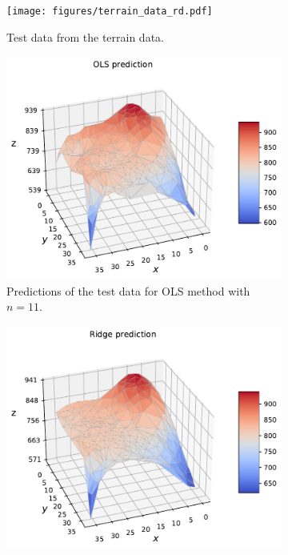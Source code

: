 \documentclass[norsk,a4paper,12pt]{scrartcl}
\begin{document}
\begin{figure}[H]
     \centering
     \begin{subfigure}[b]{0.49\textwidth}
         \centering
         \texttt{[image: figures/terrain\_data\_rd.pdf]}
         \caption{Test data from the terrain data. }
        \label{fig:test_terrain_3D}
     \end{subfigure}
    \hfill
     \begin{subfigure}[b]{0.49\textwidth}
         \centering
         \includegraphics[width=\textwidth]{figures/OLS_predict_rd.pdf}
        \caption{Predictions of the test data for OLS method with $n=11$.}
    \label{fig:OLS_terrain_predict}
     \end{subfigure}
    \begin{subfigure}[b]{0.49\textwidth}
         \centering
         \includegraphics[width=\textwidth]{figures/Ridge_predict_rd.pdf}

\end{subfigure}
\end{figure}
\end{document}
